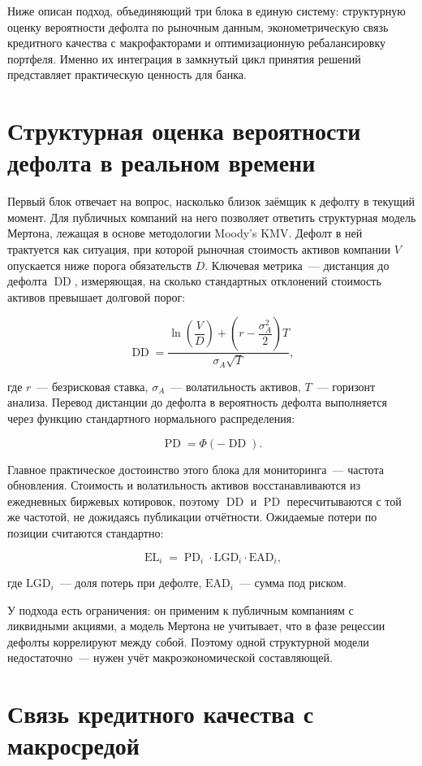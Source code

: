 \documentclass[a4paper,12pt]{article}
\DeclareMathOperator{\EL}{EL}
\DeclareMathOperator{\PD}{PD}
\DeclareMathOperator{\DD}{DD}
\begin{document}
Ниже описан подход, объединяющий три блока в единую систему: структурную оценку вероятности
дефолта по рыночным данным, эконометрическую связь кредитного качества с макрофакторами и
оптимизационную ребалансировку портфеля. Именно их интеграция в замкнутый цикл принятия
решений представляет практическую ценность для банка.

\section{Структурная оценка вероятности дефолта в реальном времени}

Первый блок отвечает на вопрос, насколько близок заёмщик к дефолту в текущий момент. Для публичных
компаний на него позволяет ответить структурная модель Мертона, лежащая в основе методологии
Moody's KMV. Дефолт в ней трактуется как ситуация, при которой рыночная стоимость активов
компании $V$ опускается ниже порога обязательств $D$. Ключевая метрика~--- дистанция до дефолта
$\DD$, измеряющая, на сколько стандартных отклонений стоимость активов превышает долговой порог:

\[
    \DD = \frac{\ln\!\left(\dfrac{V}{D}\right) + \left(r - \dfrac{\sigma_A^2}{2}\right) T}
              {\sigma_A \sqrt{T}},
\]

где $r$~--- безрисковая ставка, $\sigma_A$~--- волатильность активов, $T$~--- горизонт анализа.
Перевод дистанции до дефолта в вероятность дефолта выполняется через функцию стандартного
нормального распределения:

\[
    \PD = \Phi(-\DD).
\]

Главное практическое достоинство этого блока для мониторинга~--- частота обновления. Стоимость и
волатильность активов восстанавливаются из ежедневных биржевых котировок, поэтому $\DD$ и $\PD$
пересчитываются с той же частотой, не дожидаясь публикации отчётности. Ожидаемые потери по позиции считаются стандартно:

\[
    \EL_{i} = \PD_{i} \cdot \mathrm{LGD}_{i} \cdot \mathrm{EAD}_{i},
\]

где $\mathrm{LGD}_i$~--- доля потерь при дефолте, $\mathrm{EAD}_i$~--- сумма под риском.

У подхода есть ограничения: он применим к публичным компаниям с ликвидными акциями, а
модель Мертона не учитывает, что в фазе рецессии дефолты коррелируют между собой.
Поэтому одной структурной модели недостаточно~--- нужен учёт макроэкономической составляющей.

\section{Связь кредитного качества с макросредой}
\end{document}
